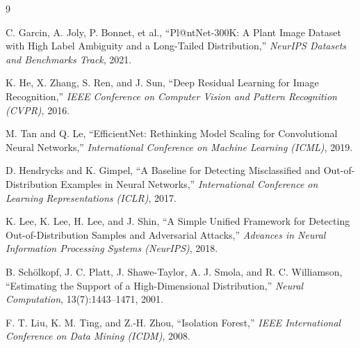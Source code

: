 \documentclass[11pt]{article}
\begin{document}
\begin{thebibliography}{9}

C. Garcin, A. Joly, P. Bonnet, et al.,
``Pl@ntNet-300K: A Plant Image Dataset with High Label Ambiguity and a Long-Tailed Distribution,''
\emph{NeurIPS Datasets and Benchmarks Track}, 2021.

K. He, X. Zhang, S. Ren, and J. Sun,
``Deep Residual Learning for Image Recognition,''
\emph{IEEE Conference on Computer Vision and Pattern Recognition (CVPR)}, 2016.

M. Tan and Q. Le,
``EfficientNet: Rethinking Model Scaling for Convolutional Neural Networks,''
\emph{International Conference on Machine Learning (ICML)}, 2019.

D. Hendrycks and K. Gimpel,
``A Baseline for Detecting Misclassified and Out-of-Distribution Examples in Neural Networks,''
\emph{International Conference on Learning Representations (ICLR)}, 2017.

K. Lee, K. Lee, H. Lee, and J. Shin,
``A Simple Unified Framework for Detecting Out-of-Distribution Samples and Adversarial Attacks,''
\emph{Advances in Neural Information Processing Systems (NeurIPS)}, 2018.

B. Sch\"olkopf, J. C. Platt, J. Shawe-Taylor, A. J. Smola, and R. C. Williamson,
``Estimating the Support of a High-Dimensional Distribution,''
\emph{Neural Computation}, 13(7):1443--1471, 2001.

F. T. Liu, K. M. Ting, and Z.-H. Zhou,
``Isolation Forest,''
\emph{IEEE International Conference on Data Mining (ICDM)}, 2008.

\end{thebibliography}
\end{document}
